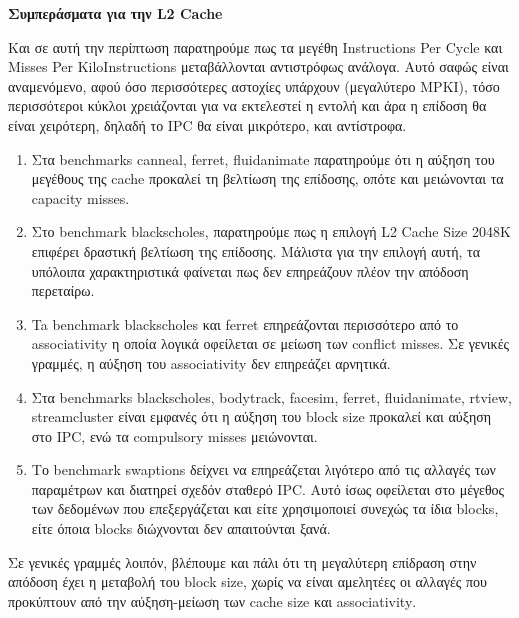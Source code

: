 \begin{center}
    \textbf{Συμπεράσματα για την \textlatin{L2 Cache}}    
\end{center}

Και σε αυτή την περίπτωση παρατηρούμε πως τα μεγέθη Instructions Per Cycle και
Misses Per KiloInstructions μεταβάλλονται αντιστρόφως ανάλογα. Αυτό σαφώς είναι
αναμενόμενο, αφού όσο περισσότερες αστοχίες υπάρχουν (μεγαλύτερο MPKI), τόσο
περισσότεροι κύκλοι χρειάζονται για να εκτελεστεί η εντολή και άρα η επίδοση θα
είναι χειρότερη, δηλαδή το IPC θα είναι μικρότερο, και αντίστροφα. 

\begin{enumerate}
    \item Στα \textlatin{benchmarks canneal, ferret, fluidanimate} παρατηρούμε
    ότι η αύξηση του μεγέθους της \textlatin{cache} προκαλεί τη βελτίωση της
    επίδοσης, οπότε και μειώνονται τα \textlatin{capacity misses}.  
    
    \item Στο \textlatin{benchmark blackscholes}, παρατηρούμε πως η επιλογή L2
    Cache Size 2048K επιφέρει δραστική βελτίωση της επίδοσης. Μάλιστα για
    την επιλογή αυτή, τα υπόλοιπα χαρακτηριστικά φαίνεται πως δεν επηρεάζουν
    πλέον την απόδοση περεταίρω.

    \item Ta \textlatin{benchmark blackscholes} και ferret επηρεάζονται
    περισσότερο από το \textlatin{associativity} η οποία λογικά οφείλεται σε
    μείωση των \textlatin{conflict misses}. Σε γενικές γραμμές, η αύξηση του
    \textlatin{associativity} δεν επηρεάζει αρνητικά.
    
    \item Στα \textlatin{benchmarks blackscholes, bodytrack, facesim, ferret,
    fluidanimate, rtview, streamcluster} είναι εμφανές ότι η αύξηση του
    \textlatin{block size} προκαλεί και αύξηση στο \textlatin{IPC}, ενώ τα
    \textlatin{compulsory misses} μειώνονται. 
    
    \item Το \textlatin{benchmark swaptions} δείχνει να επηρεάζεται λιγότερο από
    τις αλλαγές των παραμέτρων και διατηρεί σχεδόν σταθερό \textlatin{IPC}. Αυτό
    ίσως οφείλεται στο μέγεθος των δεδομένων που επεξεργάζεται και είτε
    χρησιμοποιεί συνεχώς τα ίδια \textlatin{blocks}, είτε όποια
    \textlatin{blocks} διώχνονται δεν απαιτούνται ξανά.

\end{enumerate}

Σε γενικές γραμμές λοιπόν, βλέπουμε και πάλι ότι τη μεγαλύτερη επίδραση στην
απόδοση έχει η μεταβολή του \textlatin{block size}, χωρίς να είναι
αμελητέες οι αλλαγές που προκύπτουν από την αύξηση-μείωση των \textlatin{cache
size} και \textlatin{associativity}.
\vspace{1cm}

